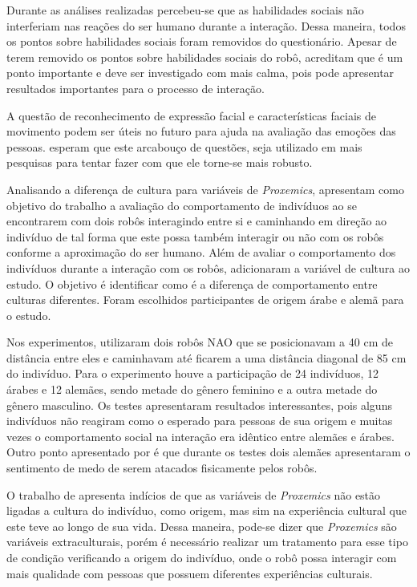 Durante as análises realizadas percebeu-se que as habilidades sociais não interferiam nas reações do ser humano durante a interação. Dessa maneira, todos os pontos sobre habilidades sociais foram removidos do questionário. Apesar de terem removido os pontos sobre habilidades sociais do robô, \textcite{joosse:2011} acreditam que é um ponto importante e deve ser investigado com mais calma, pois pode apresentar resultados importantes para o processo de interação.

A questão de reconhecimento de expressão facial e características faciais de movimento podem ser úteis no futuro para ajuda na avaliação das emoções das pessoas. \textcite{joosse:2011} esperam que este arcabouço de questões, seja utilizado em mais pesquisas para tentar fazer com que ele torne-se mais robusto.

Analisando a diferença de cultura para variáveis de \emph{Proxemics}, \textcite{eresha:2013} apresentam como objetivo do trabalho a avaliação do comportamento de indivíduos ao se encontrarem com dois robôs interagindo entre si e caminhando em direção ao indivíduo de tal forma que este possa também interagir ou não com os robôs conforme a aproximação do ser humano. Além de avaliar o comportamento dos indivíduos durante a interação com os robôs, \textcite{eresha:2013} adicionaram a variável de cultura ao estudo. O objetivo é identificar como é a diferença de comportamento entre culturas diferentes. Foram escolhidos participantes de origem árabe e alemã para o estudo.

Nos experimentos, \textcite{eresha:2013} utilizaram dois robôs NAO que se posicionavam a 40 cm de distância entre eles e caminhavam até ficarem a uma distância diagonal de 85 cm do indivíduo. Para o experimento houve a participação de 24 indivíduos, 12 árabes e 12 alemães, sendo metade do gênero feminino e a outra metade do gênero masculino. Os testes apresentaram resultados interessantes, pois alguns indivíduos não reagiram como o esperado para pessoas de sua origem e muitas vezes o comportamento social na interação era idêntico entre alemães e árabes. Outro ponto apresentado por \textcite{eresha:2013} é que durante os testes dois alemães apresentaram o sentimento de medo de serem atacados fisicamente pelos robôs.

O trabalho de \textcite{eresha:2013} apresenta indícios de que as variáveis de \emph{Proxemics} não estão ligadas a cultura do indivíduo, como origem, mas sim na experiência cultural que este teve ao longo de sua vida. Dessa maneira, pode-se dizer que \emph{Proxemics} são variáveis extraculturais, porém é necessário realizar um tratamento para esse tipo de condição verificando a origem do indivíduo, onde o robô possa interagir com mais qualidade com pessoas que possuem diferentes experiências culturais.

